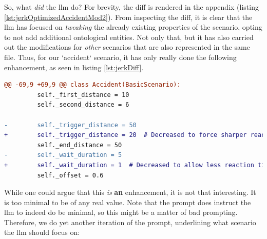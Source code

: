 So, what \emph{did} the \acrshort{llm} do? For brevity, the diff is rendered in the appendix
 (listing \ref{lst:jerkOptimizedAccidentMod2}). From inspecting the
diff, it is clear that the \acrshort{llm} has focused on \emph{tweaking} the already existing
properties of the scenario, opting to not add additional ontological entities. Not only that, but it
has also carried out the modifications for \emph{other} scenarios that are also represented in the
same file. Thus, for our `accident` scenario, it has only really done the following enhancement, as
seen in listing \ref{lst:jerkDiff}.

\begin{lstlisting}[language=diff, label={lst:jerkDiff}, caption={The relevant subset of the diff from instructing the \acrshort{llm} to make as few changes as possible, while maximizing a specific metric.}]
    @@ -69,9 +69,9 @@ class Accident(BasicScenario):
         self._first_distance = 10
         self._second_distance = 6
 
-        self._trigger_distance = 50
+        self._trigger_distance = 20  # Decreased to force sharper reactions
         self._end_distance = 50
-        self._wait_duration = 5
+        self._wait_duration = 1  # Decreased to allow less reaction time
         self._offset = 0.6
\end{lstlisting}

While one could argue that this \emph{is} \textbf{an} enhancement, it is not that interesting. It is
too minimal to be of any real value. Note that the prompt does instruct the \acrshort{llm} to indeed
do be minimal, so this might be a matter of bad prompting.
Therefore, we do yet another iteration of the prompt, underlining what scenario the \acrshort{llm}
should focus on:

